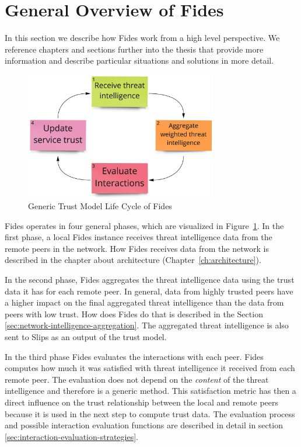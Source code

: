 \section{General Overview of Fides}
\label{sec:general-overview-of-fides}
In this section we describe how Fides work from a high level perspective. We reference chapters and sections further into the thesis that provide more information and describe particular situations and solutions in more detail.

\begin{figure}[ht!]
    \centering
    \includegraphics[width=0.75\textwidth]{assets/fides_lifecycle.jpeg}
    \caption{Generic Trust Model Life Cycle of Fides}
    \label{fig:trust-model-life-cycle}
\end{figure}

Fides operates in four general phases, which are visualized in Figure~\ref{fig:trust-model-life-cycle}.
In the first phase, a local Fides instance receives threat intelligence data from the remote peers in the network. 
How Fides receives data from the network is described in the chapter about architecture (Chapter~\ref{ch:architecture}).

In the second phase, Fides aggregates the threat intelligence data using the trust data it has for each remote peer.
In general, data from highly trusted peers have a higher impact on the final aggregated threat intelligence than the data from peers with low trust.
How does Fides do that is described in the Section~ \ref{sec:network-intelligence-aggregation}.
The aggregated threat intelligence is also sent to Slips as an output of the trust model.

In the third phase Fides evaluates the interactions with each peer.
Fides computes how much it was satisfied with threat intelligence it received from each remote peer. The evaluation does not depend on the \textit{content} of the threat intelligence and therefore is a generic method.
This satisfaction metric has then a direct influence on the trust relationship between the local and remote peers because it is used in the next step to compute trust data. 
The evaluation process and possible interaction evaluation functions are described in detail in section \ref{sec:interaction-evaluation-strategies}.

